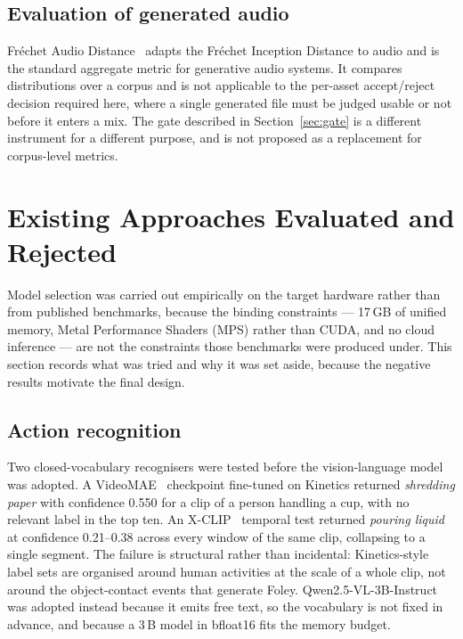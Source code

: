 \documentclass[conference]{IEEEtran}
\begin{document}
\subsection{Evaluation of generated audio}

Fréchet Audio Distance~\cite{fad2019} adapts the Fréchet Inception Distance to
audio and is the standard aggregate metric for generative audio systems. It
compares distributions over a corpus and is not applicable to the per-asset
accept/reject decision required here, where a single generated file must be
judged usable or not before it enters a mix. The gate described in
Section~\ref{sec:gate} is a different instrument for a different purpose, and is
not proposed as a replacement for corpus-level metrics.

\section{Existing Approaches Evaluated and Rejected}
\label{sec:existing}

Model selection was carried out empirically on the target hardware rather than
from published benchmarks, because the binding constraints --- 17\,GB of unified
memory, Metal Performance Shaders (MPS) rather than CUDA, and no cloud inference
--- are not the constraints those benchmarks were produced under. This section
records what was tried and why it was set aside, because the negative results
motivate the final design.

\subsection{Action recognition}

Two closed-vocabulary recognisers were tested before the vision-language model was
adopted. A VideoMAE~\cite{videomae2022} checkpoint fine-tuned on Kinetics
returned \emph{shredding paper} with confidence 0.550 for a clip of a person
handling a cup, with no relevant label in the top ten. An
X-CLIP~\cite{xclip2022} temporal test returned \emph{pouring liquid} at
confidence 0.21--0.38 across every window of the same clip, collapsing to a single
segment. The failure is structural rather than incidental: Kinetics-style label
sets are organised around human activities at the scale of a whole clip, not
around the object-contact events that generate Foley. Qwen2.5-VL-3B-Instruct
\cite{qwen25vl2025} was adopted instead because it emits free text, so the
vocabulary is not fixed in advance, and because a 3\,B model in bfloat16 fits the
memory budget.
\end{document}
